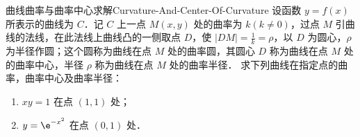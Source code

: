 \begin{solution}
    \begin{center}
    \end{center}
\end{solution}

\begin{problem}{曲线曲率与曲率中心求解}{Curvature-And-Center-Of-Curvature}
    设函数 $y = f(x)$ 所表示的曲线为 $C$．记 $C$ 上一点 $M(x, y)$ 处的曲率为 $k(k \neq 0)$，过点 $M$ 引曲线的法线，在此法线上曲线凸的一侧取点 $D$，使 $|DM| = \frac{1}{k} = \rho$，以 $D$ 为圆心，$\rho$ 为半径作圆；这个圆称为曲线在点 $M$ 处的曲率圆，其圆心 $D$ 称为曲线在点 $M$ 处的曲率中心，半径 $\rho$ 称为曲线在点 $M$ 处的曲率半径．
    求下列曲线在指定点的曲率，曲率中心及曲率半径：
    \begin{enumerate}
        \item $xy = 1$ 在点 $(1, 1)$ 处；
        \item $y = \e^{-x^2}$ 在点 $(0, 1)$ 处．
    \end{enumerate}
\end{problem}


